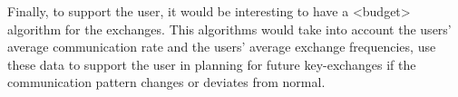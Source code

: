 Finally, to support the user, it would be interesting to have a <budget> 
algorithm for the exchanges.
This algorithms would take into account the users' average communication rate 
and the users' average exchange frequencies, use these data to support the user 
in planning for future key-exchanges if the communication pattern changes or 
deviates from normal.





\printbibliography{}

